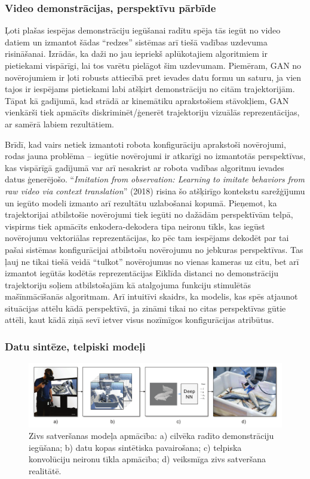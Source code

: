 \documentclass[12pt, a4paper]{article}
\numberwithin{equation}{section} %
\begin{document}
\subsubsection{Video demonstrācijas, perspektīvu pārbīde}

Ļoti plašas iespējas demonstrāciju iegūšanai radītu spēja tās iegūt no video datiem un izmantot šādas ``redzes'' sistēmas arī tiešā vadības uzdevuma risināšanai. Izrādās, ka daži no jau iepriekš aplūkotajiem algoritmiem ir pietiekami vispārīgi, lai tos varētu pielāgot šim uzdevumam. Piemēram, GAN no novērojumiem \cite{torabi2018generative} ir ļoti robusts attiecībā pret ievades datu formu un saturu, ja vien tajos ir iespējams pietiekami labi atšķirt demonstrāciju no citām trajektorijām. Tāpat kā gadījumā, kad strādā ar kinemātiku aprakstošiem stāvokļiem, GAN vienkārši tiek apmācīts diskriminēt/ģenerēt trajektoriju vizuālās reprezentācijas, ar samērā labiem rezultātiem.


Brīdī, kad vairs netiek izmantoti robota konfigurāciju aprakstoši novērojumi, rodas jauna problēma -- iegūtie novērojumi ir atkarīgi no izmantotās perspektīvas, kas vispārīgā gadījumā var arī nesakrist ar robota vadības algoritmu ievades datus ģenerējošo. ``\textit{Imitation from observation: Learning to imitate behaviors from raw video via context translation}'' \cite{liu2018imitation} (2018) risina šo atšķirīgo kontekstu sarežģījumu un iegūto modeli izmanto arī rezultātu uzlabošanai kopumā. Pieņemot, ka trajektorijai atbilstošie novērojumi tiek iegūti no dažādām perspektīvām telpā, vispirms tiek apmācīts enkodera-dekodera tipa neironu tīkls, kas iegūst novērojumu vektoriālas reprezentācijas, ko pēc tam iespējams dekodēt par tai pašai sistēmas konfigurācijai atbilstošu novērojumu no jebkuras perspektīvas. Tas ļauj ne tikai tiešā veidā ``tulkot'' novērojumus no vienas kameras uz citu, bet arī izmantot iegūtās kodētās reprezentācijas Eiklīda distanci no demonstrāciju trajektoriju soļiem atbilstošajām kā atalgojuma funkciju stimulētās mašīnmācīšanās algoritmam. Arī intuitīvi skaidrs, ka modelis, kas spēs atjaunot situācijas attēlu kādā perspektīvā, ja zināmi tikai no citas perspektīvas gūtie attēli, kaut kādā ziņā sevī ietver visus nozīmīgos konfigurācijas atribūtus.

\subsubsection{Datu sintēze, telpiski modeļi}

\begin{figure}[t!]
    \centering
    \includegraphics[width=16cm]{../img/fish.png}
    \caption{Zivs satveršanas modeļa apmācība: a) cilvēka radīto demonstrāciju iegūšana; b) datu kopas sintētiska pavairošana; c) telpiska konvolūciju neironu tīkla apmācība; d) veiksmīga zivs satveršana realitātē. \cite{dyrstad2018teaching}}
\end{figure}
\end{document}
